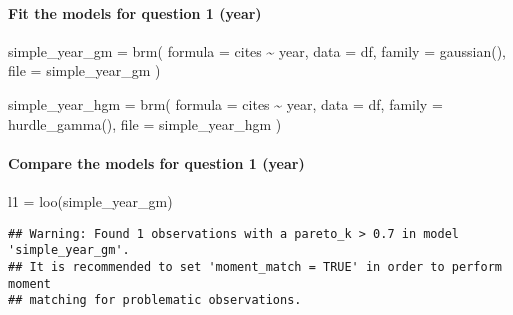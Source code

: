 \documentclass[
]{article}
\newenvironment{Shaded}{\begin{snugshade}}{\end{snugshade}}
\newcommand{\AttributeTok}[1]{\textcolor[rgb]{0.77,0.63,0.00}{#1}}
\newcommand{\FunctionTok}[1]{\textcolor[rgb]{0.00,0.00,0.00}{#1}}
\newcommand{\NormalTok}[1]{#1}
\newcommand{\OtherTok}[1]{\textcolor[rgb]{0.56,0.35,0.01}{#1}}
\newcommand{\SpecialCharTok}[1]{\textcolor[rgb]{0.00,0.00,0.00}{#1}}
\newcommand{\StringTok}[1]{\textcolor[rgb]{0.31,0.60,0.02}{#1}}
\begin{document}
\hypertarget{fit-the-models-for-question-1-year}{%
\paragraph{Fit the models for question 1
(year)}\label{fit-the-models-for-question-1-year}}

\begin{Shaded}
\begin{Highlighting}[]
\NormalTok{simple\_year\_gm }\OtherTok{=} \FunctionTok{brm}\NormalTok{(}
  \AttributeTok{formula =}\NormalTok{ cites }\SpecialCharTok{\textasciitilde{}}\NormalTok{ year,}
  \AttributeTok{data =}\NormalTok{ df,}
  \AttributeTok{family =} \FunctionTok{gaussian}\NormalTok{(),}
  \AttributeTok{file =} \StringTok{\textquotesingle{}simple\_year\_gm\textquotesingle{}}
\NormalTok{)}
\end{Highlighting}
\end{Shaded}

\begin{Shaded}
\begin{Highlighting}[]
\NormalTok{simple\_year\_hgm }\OtherTok{=} \FunctionTok{brm}\NormalTok{(}
  \AttributeTok{formula =}\NormalTok{ cites }\SpecialCharTok{\textasciitilde{}}\NormalTok{ year,}
  \AttributeTok{data =}\NormalTok{ df,}
  \AttributeTok{family =} \FunctionTok{hurdle\_gamma}\NormalTok{(),}
  \AttributeTok{file =} \StringTok{\textquotesingle{}simple\_year\_hgm\textquotesingle{}}
\NormalTok{)}
\end{Highlighting}
\end{Shaded}

\hypertarget{compare-the-models-for-question-1-year}{%
\paragraph{Compare the models for question 1
(year)}\label{compare-the-models-for-question-1-year}}

\begin{Shaded}
\begin{Highlighting}[]
\NormalTok{l1 }\OtherTok{=} \FunctionTok{loo}\NormalTok{(simple\_year\_gm)}
\end{Highlighting}
\end{Shaded}

\begin{verbatim}
## Warning: Found 1 observations with a pareto_k > 0.7 in model 'simple_year_gm'.
## It is recommended to set 'moment_match = TRUE' in order to perform moment
## matching for problematic observations.
\end{verbatim}
\end{document}
